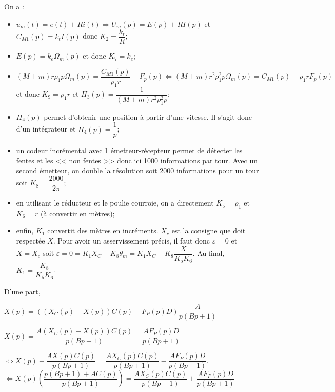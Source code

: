 \begin{corrigebox}
On a :
\begin{itemize}
\item $ u_m(t)=e(t)+Ri(t) \Rightarrow  U_m(p)=E(p)+RI(p) $ et $C_{M1}(p)=k_t I(p)$ donc $K_2 = \dfrac{k_t}{R}$;
\item $E(p)=k_e\Omega_m(p)$ et donc $K_7 = k_e$;
\item $\left(M+m\right)r\rho_1 p\Omega_m(p)=\dfrac{C_{M1}(p)}{\rho_1 r}-F_p(p) \Leftrightarrow\left(M+m\right)r^2\rho_1^2 p\Omega_m(p)=C_{M1}(p)-\rho_1 rF_p(p) $ et donc $K_9 = \rho_1 r$ et $H_3(p)=\dfrac{1}{\left(M+m\right)r^2\rho_1^2 p}$;
\item  $H_4(p)$ permet d'obtenir une position à partir d'une vitesse. Il s'agit donc d'un intégrateur et $H_4(p)=\dfrac{1}{p}$; 
\item un codeur incrémental avec 1 émetteur-récepteur permet de détecter les fentes et les << non fentes >> donc ici 1000 informations par tour. Avec un second émetteur, on double la résolution soit 2000 informations pour un tour soit $K_8  = \dfrac{2000}{2\pi}$;
\item en utilisant le réducteur et le poulie courroie, on a directement $K_5=\rho_1$ et $K_6=r$ (à convertir en mètres);
\item enfin, $K_1$ convertit des mètres en incréments. $X_c$ est la consigne que doit respectée $X$. Pour avoir un asservissement précis, il faut donc $\varepsilon = 0$ et $X=X_c$ soit $\varepsilon = 0 = K_1 X_C - K_8 \theta_m = K_1 X_C - K_8 \dfrac{X}{K_5 K_6}$. Au final, $K_1 =\dfrac{K_8}{K_5 K_6}$.
\end{itemize}
D'une part,

$X(p)=\left(\left(X_C(p)-X(p)\right)C(p)-F_P(p) D \right)\dfrac{A}{p\left(Bp+1\right)}$

$X(p)=\dfrac{A\left(X_C(p)-X(p)\right)C(p)}{p\left(Bp+1\right)}- \dfrac{AF_P(p) D}{p\left(Bp+1\right)}$

$\Leftrightarrow X(p)+\dfrac{AX(p)C(p)}{p\left(Bp+1\right)}=\dfrac{AX_C(p)C(p)}{p\left(Bp+1\right)}- \dfrac{AF_P(p) D}{p\left(Bp+1\right)}$.
$\Leftrightarrow X(p)\left(\dfrac{p\left(Bp+1\right)+AC(p)}{p\left(Bp+1\right)}\right)=\dfrac{AX_C(p)C(p)}{p\left(Bp+1\right)}+ \dfrac{AF_P(p) D}{p\left(Bp+1\right)}$


\end{corrigebox}
